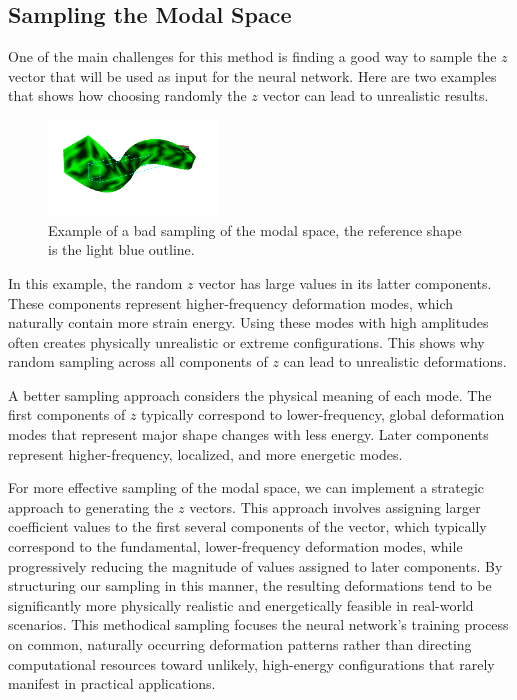 \subsection{Sampling the Modal Space}
\label{sec:sampling_modal_space}
One of the main challenges for this method is finding a good way to sample the \(z\) vector that will be used as input for the neural network. Here are two examples that shows how choosing randomly the \(z\) vector can lead to unrealistic results. 
\begin{figure}[H]
    \centering
    \includegraphics[width=0.4\textwidth]{Images/z_random.png}
    \caption{Example of a bad sampling of the modal space, the reference shape is the light blue outline.}
    \label{fig:bad_sampling}
\end{figure}
In this example, the random \(z\) vector has large values in its latter components. These components represent higher-frequency deformation modes, which naturally contain more strain energy. Using these modes with high amplitudes often creates physically unrealistic or extreme configurations. This shows why random sampling across all components of \(z\) can lead to unrealistic deformations.

A better sampling approach considers the physical meaning of each mode. The first components of \(z\) typically correspond to lower-frequency, global deformation modes that represent major shape changes with less energy. Later components represent higher-frequency, localized, and more energetic modes. 

For more effective sampling of the modal space, we can implement a strategic approach to generating the \(z\) vectors. This approach involves assigning larger coefficient values to the first several components of the vector, which typically correspond to the fundamental, lower-frequency deformation modes, while progressively reducing the magnitude of values assigned to later components. By structuring our sampling in this manner, the resulting deformations tend to be significantly more physically realistic and energetically feasible in real-world scenarios. This methodical sampling focuses the neural network's training process on common, naturally occurring deformation patterns rather than directing computational resources toward unlikely, high-energy configurations that rarely manifest in practical applications.

